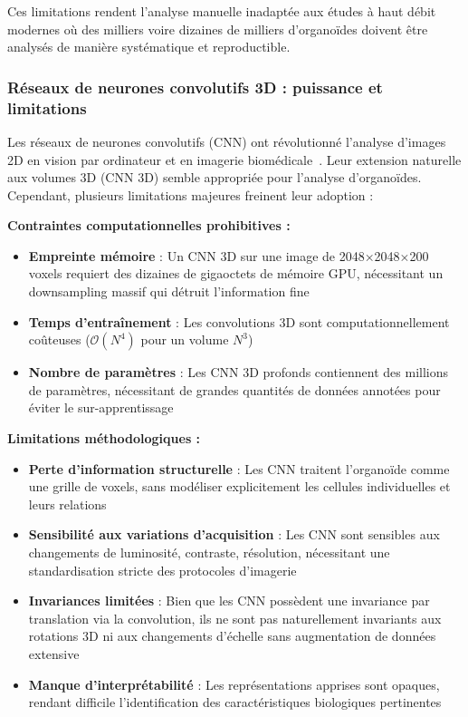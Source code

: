Ces limitations rendent l'analyse manuelle inadaptée aux études à haut débit modernes où des milliers voire dizaines de milliers d'organoïdes doivent être analysés de manière systématique et reproductible.

\subsubsection{Réseaux de neurones convolutifs 3D : puissance et limitations}

Les réseaux de neurones convolutifs (CNN) ont révolutionné l'analyse d'images 2D en vision par ordinateur et en imagerie biomédicale~\cite{LeCun2015,Krizhevsky2012}. Leur extension naturelle aux volumes 3D (CNN 3D) semble appropriée pour l'analyse d'organoïdes. Cependant, plusieurs limitations majeures freinent leur adoption :

\textbf{Contraintes computationnelles prohibitives :}
\begin{itemize}
    \item \textbf{Empreinte mémoire} : Un CNN 3D sur une image de 2048×2048×200 voxels requiert des dizaines de gigaoctets de mémoire GPU, nécessitant un downsampling massif qui détruit l'information fine
    \item \textbf{Temps d'entraînement} : Les convolutions 3D sont computationnellement coûteuses ($\mathcal{O}(N^4)$ pour un volume $N^3$)
    \item \textbf{Nombre de paramètres} : Les CNN 3D profonds contiennent des millions de paramètres, nécessitant de grandes quantités de données annotées pour éviter le sur-apprentissage
\end{itemize}

\textbf{Limitations méthodologiques :}
\begin{itemize}
    \item \textbf{Perte d'information structurelle} : Les CNN traitent l'organoïde comme une grille de voxels, sans modéliser explicitement les cellules individuelles et leurs relations
    \item \textbf{Sensibilité aux variations d'acquisition} : Les CNN sont sensibles aux changements de luminosité, contraste, résolution, nécessitant une standardisation stricte des protocoles d'imagerie
    \item \textbf{Invariances limitées} : Bien que les CNN possèdent une invariance par translation via la convolution, ils ne sont pas naturellement invariants aux rotations 3D ni aux changements d'échelle sans augmentation de données extensive
    \item \textbf{Manque d'interprétabilité} : Les représentations apprises sont opaques, rendant difficile l'identification des caractéristiques biologiques pertinentes
\end{itemize}

